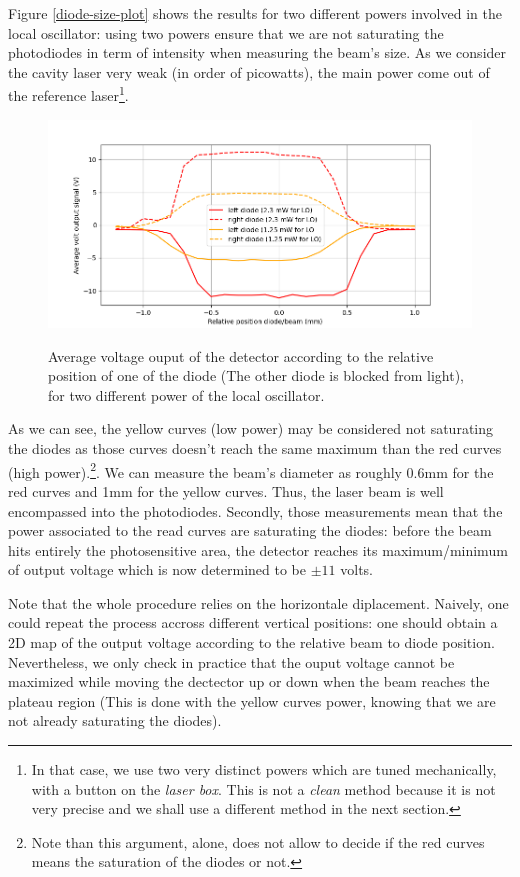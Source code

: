 \documentclass[10pt]{report}
\begin{document}
Figure \ref{diode-size-plot} shows the results for two different powers involved in the local oscillator: using two powers ensure that we are not saturating the photodiodes in term of intensity when measuring the beam's size. As we consider the cavity laser very weak (in order of picowatts), the main power come out of the reference laser\footnote{In that case, we use two very distinct powers which are tuned mechanically, with a button on the \textit{laser box}. This is not a \textit{clean} method because it is not very precise and we shall use a different method in the next section.}.

\begin{figure}[h!]
\caption{Average voltage ouput of the detector according to the relative position of one of the diode (The other diode is blocked from light), for two different power of the local oscillator.}
\centering
\includegraphics[width=\textwidth]{diode-size-plot}
\label{fig:diode-size-plot}
\end{figure}

As we can see, the yellow curves (low power) may be considered not saturating the diodes as those curves doesn't reach the same maximum than the red curves (high power).\footnote{Note than this argument, alone, does not allow to decide if the red curves means the saturation of the diodes or not.}. We can measure the beam's diameter as roughly 0.6mm for the red curves and 1mm for the yellow curves. Thus, the laser beam is well encompassed into the photodiodes. Secondly, those measurements mean that the power associated to the read curves are saturating the diodes: before the beam hits entirely the photosensitive area, the detector reaches its maximum/minimum of output voltage which is now determined to be $\pm11$ volts.

Note that the whole procedure relies on the horizontale diplacement. Naively, one could repeat the process accross different vertical positions: one should obtain a 2D map of the output voltage according to the relative beam to diode position. Nevertheless, we only check in practice that the ouput voltage cannot be maximized while moving the dectector up or down when the beam reaches the plateau region (This is done with the yellow curves power, knowing that we are not already saturating the diodes).
\end{document}
